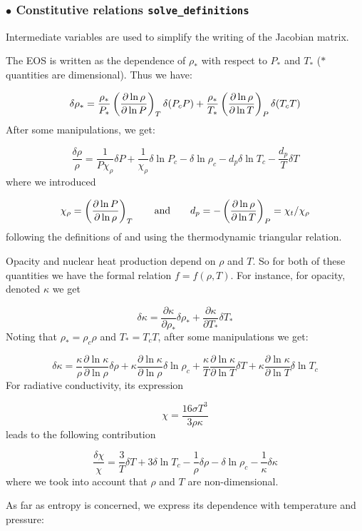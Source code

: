 \subsubsection{$\bullet$ \bf Constitutive relations {\tt solve\_definitions}}

Intermediate variables are used to simplify the writing of the Jacobian
matrix.

The EOS is written as the dependence of $\rho_*$ with respect to $P_*$ and
$T_*$ ($*$ quantities are dimensional). Thus we have:

\[ \delta\rho_* = \frac{\rho_*}{P_*}\left(\frac{\partial\ln\rho}{\partial\ln
P}\right)_T\delta(P_cP) + \frac{\rho_*}{T_*}\left(\frac{\partial\ln\rho}{\partial\ln
T}\right)_P\delta(T_cT)\]
After some manipulations, we get:

\[ \frac{\delta\rho}{\rho} = \frac{1}{P\chi_\rho}\delta P +
\frac{1}{\chi_\rho}\delta\ln P_c -\delta\ln\rho_c - d_p\delta\ln T_c -
\frac{d_p}{T}\delta T\]
where we introduced

\[ \chi_\rho = \left(\frac{\partial\ln P}{\partial\ln\rho}\right)_T \qquad {\rm and}\qquad d_p
= -\left(\frac{\partial\ln\rho}{\partial\ln T}\right)_P = \chi_t/\chi_\rho \]
following the definitions of \cite{RSI96} and using the thermodynamic
triangular relation.

\bigskip
Opacity and nuclear heat production depend on $\rho$ and $T$. So for both of
these quantities we have the formal relation $f=f(\rho,T)$. For instance, for
opacity, denoted $\kappa$ we get

\[ \delta\kappa = \frac{\partial\kappa}{\partial\rho_*}\delta\rho_* +
\frac{\partial\kappa}{\partial T_*}\delta T_*\]
Noting that $\rho_*=\rho_c\rho$ and $T_*=T_cT$, after some manipulations we
get:

\[ \delta\kappa =
\frac{\kappa}{\rho}\frac{\partial\ln\kappa}{\partial\ln\rho}\delta\rho +
\kappa\frac{\partial\ln\kappa}{\partial\ln\rho}\delta\ln\rho_c +
\frac{\kappa}{T}\frac{\partial\ln\kappa}{\partial\ln T}\delta T +
\kappa\frac{\partial\ln\kappa}{\partial\ln T}\delta\ln T_c\]
For radiative conductivity, its expression

\[ \chi = \frac{16\sigma T^3}{3\rho\kappa}\]
leads to the following contribution

\[ \frac{\delta \chi}{\chi} = \frac{3}{T}\delta T+3\delta\ln T_c
-\frac{1}{\rho}\delta\rho - \delta\ln\rho_c - \frac{1}{\kappa}\delta\kappa\]
where we took into account that $\rho$ and $T$ are non-dimensional.

As far as entropy is concerned, we express its dependence with temperature and
pressure:

